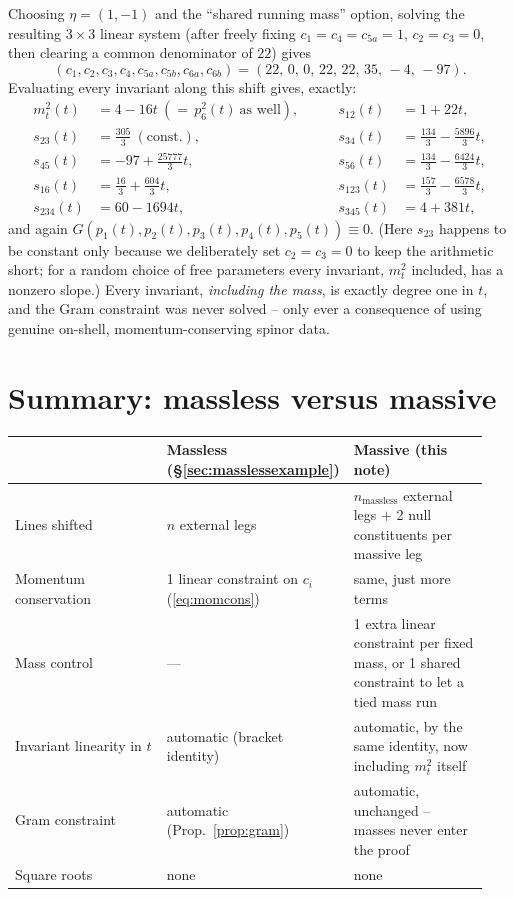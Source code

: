 \documentclass[11pt]{article}
\theoremstyle{definition}
\begin{document}
Choosing $\eta=(1,-1)$ and the ``shared running mass'' option, solving the resulting $3\times3$
linear system (after freely fixing $c_1=c_4=c_{5a}=1,\,c_2=c_3=0$, then clearing a common
denominator of $22$) gives
\begin{equation}
(c_1,c_2,c_3,c_4,c_{5a},c_{5b},c_{6a},c_{6b}) = (22,\,0,\,0,\,22,\,22,\,35,\,-4,\,-97).
\end{equation}
Evaluating every invariant along this shift gives, exactly:
\begin{equation}
\begin{alignedat}{2}
m_t^2(t) &= 4-16t \ (=\, p_6^2(t)\ \text{as well}), &\qquad
s_{12}(t) &= 1+22t,\\
s_{23}(t) &= \tfrac{305}{3}\ (\text{const.}), &\qquad
s_{34}(t) &= \tfrac{134}{3}-\tfrac{5896}{3}t,\\
s_{45}(t) &= -97+\tfrac{25777}{3}t, &\qquad
s_{56}(t) &= \tfrac{134}{3}-\tfrac{6424}{3}t,\\
s_{16}(t) &= \tfrac{16}{3}+\tfrac{604}{3}t, &\qquad
s_{123}(t) &= \tfrac{157}{3}-\tfrac{6578}{3}t,\\
s_{234}(t) &= 60-1694t, &\qquad
s_{345}(t) &= 4+381t,
\end{alignedat}
\end{equation}
and again $G(p_1(t),p_2(t),p_3(t),p_4(t),p_5(t)) \equiv 0$. (Here $s_{23}$ happens to be constant
only because we deliberately set $c_2=c_3=0$ to keep the arithmetic short; for a random choice of
free parameters every invariant, $m_t^2$ included, has a nonzero slope.) Every invariant,
\emph{including the mass}, is exactly degree one in $t$, and the Gram constraint was never solved
-- only ever a consequence of using genuine on-shell, momentum-conserving spinor data.

\section{Summary: massless versus massive}

\begin{center}
\begin{tabular}{@{}p{0.34\linewidth}p{0.3\linewidth}p{0.3\linewidth}@{}}
\toprule
 & \textbf{Massless (\S\ref{sec:masslessexample})} & \textbf{Massive (this note)} \\
\midrule
Lines shifted & $n$ external legs & $n_{\text{massless}}$ external legs $+$ 2 null constituents per massive leg \\
Momentum conservation & 1 linear constraint on $c_i$ (\eqref{eq:momcons}) & same, just more terms \\
Mass control & --- & 1 extra linear constraint per fixed mass, or 1 shared constraint to let a tied mass run \\
Invariant linearity in $t$ & automatic (bracket identity) & automatic, by the same identity, now including $m_t^2$ itself \\
Gram constraint & automatic (Prop.~\ref{prop:gram}) & automatic, unchanged -- masses never enter the proof \\
Square roots & none & none \\
\bottomrule
\end{tabular}
\end{center}
\end{document}
